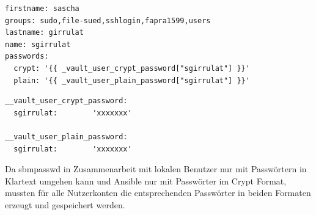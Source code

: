 \begin{lstlisting}[label=code:labelname,caption=Auszug aus ansible/group\_vars/file\_server/public]
firstname: sascha
groups: sudo,file-sued,sshlogin,fapra1599,users
lastname: girrulat
name: sgirrulat
passwords:
  crypt: '{{ _vault_user_crypt_password["sgirrulat"] }}'
  plain: '{{ _vault_user_plain_password["sgirrulat"] }}'
\end{lstlisting}

\begin{lstlisting}[label=code:labelname,caption=Modifizierter Auszug aus ansible/group\_vars/file\_server/vault]
__vault_user_crypt_password:
  sgirrulat:        'xxxxxxx'

__vault_user_plain_password:
  sgirrulat:        'xxxxxxx'
\end{lstlisting}

Da sbmpasswd in Zusammenarbeit mit lokalen Benutzer nur mit Passwörtern in Klartext umgehen kann und Ansible nur mit Passwörter im Crypt Format, mussten für alle Nutzerkonten die entsprechenden Passwörter in beiden Formaten erzeugt und gespeichert werden.

